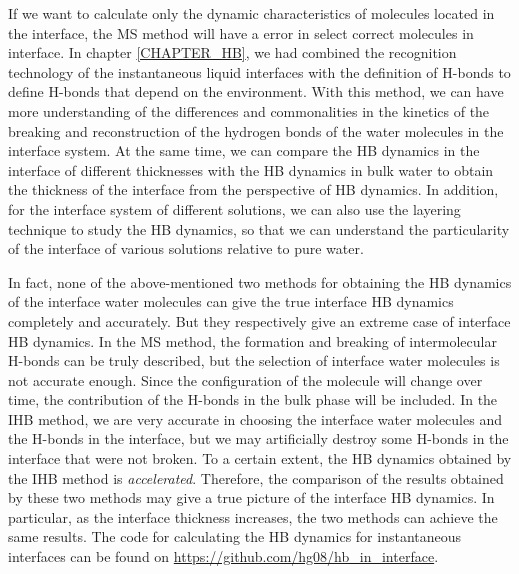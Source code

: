 If we want to calculate only the dynamic characteristics of molecules located in the interface, 
the MS method will have a error in select correct molecules in interface. 
In chapter \ref{CHAPTER_HB}, we had combined the recognition technology of the instantaneous liquid interfaces \cite{Willard2010} 
with the definition of H-bonds \cite{AL96b,Luzar1996} to define H-bonds that depend on the environment. 
With this method, we can have more understanding of the differences and commonalities in the kinetics of the breaking and reconstruction of the hydrogen bonds 
of the water molecules in the interface system. At the same time, we can compare the HB dynamics in the interface of different thicknesses 
with the HB dynamics in bulk water to obtain the thickness of the interface from the perspective of HB dynamics. 
In addition, for the interface system of different solutions, we can also use the layering technique to study the HB dynamics,
so that we can understand the particularity of the interface of various solutions relative to pure water. 

In fact, none of the above-mentioned two methods for obtaining the HB dynamics of the interface water molecules 
can give the true interface HB dynamics completely and accurately. But they respectively give an extreme case of interface HB dynamics. 
In the MS method, the formation and breaking of intermolecular H-bonds can be truly described, 
but the selection of interface water molecules is not accurate enough. Since the configuration of the molecule will change over time, 
the contribution of the H-bonds in the bulk phase will be included. 
In the IHB method, we are very accurate in choosing the interface water molecules and the H-bonds in the interface, 
but we may artificially destroy some H-bonds in the interface that were not broken. 
To a certain extent, the HB dynamics obtained by the IHB method is \emph{accelerated}. 
Therefore, the comparison of the results obtained by these two methods may give a true picture of the interface HB dynamics.
In particular, as the interface thickness increases, the two methods can achieve the same results.
The code for calculating the HB dynamics for instantaneous interfaces can be found on \url{https://github.com/hg08/hb_in_interface}. 
